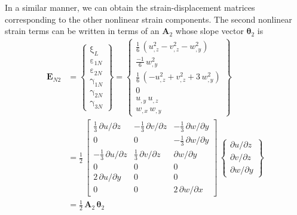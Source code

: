 In a similar manner, we can obtain the strain-displacement matrices corresponding to the other nonlinear strain components. The second nonlinear strain terms can be written in terms of an $\mathbf{A}_2$ whose slope vector $\boldsymbol{\theta}_2$ is
\begin{equation}
\begin{aligned}
\mathbf{E}_{N2} & =  \begin{Bmatrix}
\mathrm \xi_{L} \\
\mathrm \varepsilon_{1N} \\
\mathrm \varepsilon_{2N} \\
\mathrm \gamma_{1N} \\
\mathrm \gamma_{2N} \\
\mathrm \gamma_{3N} \end{Bmatrix} =
\begin{Bmatrix}
\tfrac{1}{6} \,  \left( u_{,z}^2 - v_{,z}^2 - w_{,y}^2  \right)\\
\tfrac{-1}{6} \, w_{,y}^2 \\
\tfrac{1}{6} \,  \left( - u_{,z}^2  + v_{,z}^2 + 3 \, w_{,y}^2 \right) \\
0 \\
u_{,y} \, u_{,z}  \\ 
w_{,x} \, w_{,y} \end{Bmatrix} \\
& = \frac{1}{2} \, \begin{bmatrix}
 \tfrac{1}{3} \, \partial u / \partial z &  - \tfrac{1}{3} \, \partial v / \partial z & - \tfrac{1}{3} \, \partial w / \partial y  \\
0 & 0 & - \tfrac{1}{3} \, \partial w / \partial y  \\
-\tfrac{1}{3} \, \partial u / \partial z  & \tfrac{1}{3} \, \partial v / \partial z & \partial w / \partial y \\
0 & 0 & 0  \\
2 \, \partial u / \partial y &  0 & 0 \\
0 &  0 &  2 \, \partial w / \partial x  \end{bmatrix} \, \begin{Bmatrix}
\partial u / \partial z\\
\partial v / \partial z \\
\partial w / \partial y
\end{Bmatrix} \\
& = \tfrac{1}{2} \, \mathbf{A}_2 \, \boldsymbol{\theta}_2
\end{aligned}
\end{equation}
